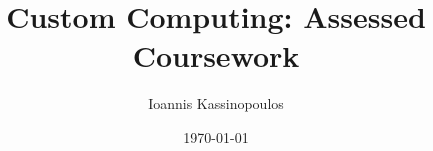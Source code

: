 \documentclass[a4paper,10pt]{article}
\begin{document}
\title{Custom Computing: Assessed Coursework}
\author{Ioannis Kassinopoulos}
\date{\today}
\maketitle
\end{document}
